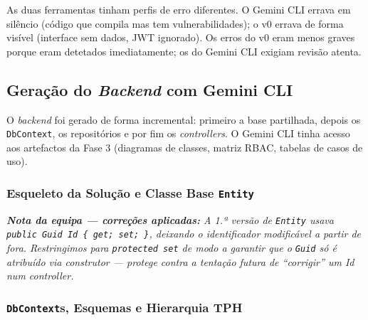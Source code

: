 As duas ferramentas tinham perfis de erro diferentes. O Gemini CLI errava em silêncio (código que compila mas tem vulnerabilidades); o v0 errava de forma visível (interface sem dados, JWT ignorado). Os erros do v0 eram menos graves porque eram detetados imediatamente; os do Gemini CLI exigiam revisão atenta.

\subsection{Geração do \textit{Backend} com Gemini CLI}\label{subsec:ia_impl_backend}

O \textit{backend} foi gerado de forma incremental: primeiro a base partilhada, depois os \texttt{DbContext}, os repositórios e por fim os \textit{controllers}. O Gemini CLI tinha acesso aos artefactos da Fase 3 (diagramas de classes, matriz RBAC, tabelas de casos de uso).

\subsubsection*{Esqueleto da Solução e Classe Base \texttt{Entity}}


\noindent\textit{\textbf{Nota da equipa --- correções aplicadas:} A 1.ª versão de \texttt{Entity} usava \texttt{public Guid Id \{ get; set; \}}, deixando o identificador modificável a partir de fora. Restringimos para \texttt{protected set} de modo a garantir que o \texttt{Guid} só é atribuído via construtor --- protege contra a tentação futura de ``corrigir'' um \textit{Id} num \textit{controller}.}

\subsubsection*{\texttt{DbContext}s, Esquemas e Hierarquia TPH}


